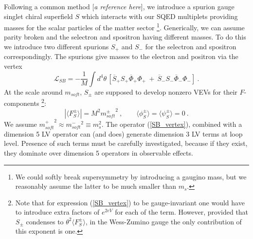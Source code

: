 \documentclass[a4paper,12pt]{article}
\begin{document}
	Following a common method [{\it a reference here}],
	we introduce a spurion gauge singlet
	chiral superfield $ S $ which interacts with our SQED
	multiplets providing masses for the scalar particles
	of the matter sector
\footnote{
	We could softly break supersymmetry by
	introducing a gaugino mass, but we reasonably assume
	the latter to be much smaller than $ m_s $. 
	}.
	Generically, we can assume parity broken and 
	the selectron and spositron having different masses.
	To do this we introduce two different
	spurions $ S_+ $ and $ S_- $
	for the selectron and spositron correspondingly.
	The spurions give masses to the electron and positron
	via the vertex
\begin{equation}
\label{SB_vertex}
  \mathcal{L}_{SB} = - \frac{1}{M} \int d^4\theta \, 
	\left[	\overline{S}_+ S_+ \overline{\Phi}_+ \Phi_+ 
		~+~
		\overline{S}_- S_- \overline{\Phi}_- \Phi_-
	\right] 
	~.
\end{equation}
	At the scale around $ m_{soft} $, $ S_\pm $ are supposed to develop
	nonzero VEVs for their $ F $-components
\footnote{
	Note that for expression (\ref{SB_vertex}) to be 
	gauge-invariant one would have to introduce extra factors
	of $ e^{2eV} $ for each of the term. 
	However, provided that $ S_\pm $ condenses to 
	$ \theta^2 \langle F^\pm_S \rangle $,
	in the Wess-Zumino gauge the only contribution of this
	exponent is one.
	}:
\[
	\left | \langle F^\pm_S \rangle \right | =
		M^2 {m^\pm_{soft}}^2~,\qquad 
		\langle\phi_S^\pm\rangle = 
		\langle\psi_S^\pm\rangle = 0~.
\]
	We assume 
	$ {m_{soft}^+}^2 \approx {m_{soft}^-}^2 \equiv m_s^2 $.
	The operator (\ref{SB_vertex}), 
	combined with a dimension 5 LV operator
	can (and does) generate dimension 3 LV terms at loop level. 
	Presence of such terms must be carefully investigated, 
	because if they exist, they dominate over dimension 5 operators
	in observable effects.
\end{document}
